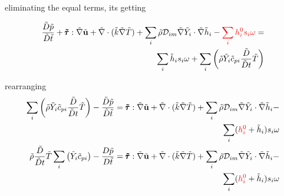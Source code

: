 \documentclass[preprint,12pt,authoryear]{elsarticle}
\begin{document}
eliminating the equal terms, its getting  

\begin{equation}
\begin{split}
        \frac{\tilde{D} \tilde{p}}{\tilde{D}\tilde{t}}
        +       
        \pmb{\tilde{\tau}}:\tilde{\nabla} \tilde{\mathbf{u}} 
        + 
        \tilde{\nabla} \cdot (\tilde{k}\tilde{\nabla} \tilde{T})
        +
        \sum\limits_i 
        \tilde{\rho}
        \mathcal{D}_{im}
        \tilde{\nabla}
        \tilde{Y}_i     
        \cdot
        \tilde{\nabla} 
        \tilde{h}_i
        -
        {\color{red} \sum_i h_i^0 s_i\omega}
        =
        \\
        \sum\limits_i
        \tilde{h}_i
        s_i  \omega
	+
        \sum\limits_i
        \left(
                \tilde{\rho}
                \tilde{Y}_i
                \tilde{c}_{pi}
                \frac{\tilde{D}}{\tilde{D} t}
                \tilde{T}
        \right)
\end{split}
\end{equation}

rearranging
\begin{equation}
\begin{split}
        \sum\limits_i
        \left(
                \tilde{\rho}
                \tilde{Y}_i
                \tilde{c}_{pi}
                \frac{\tilde{D}}{\tilde{D} t}
                \tilde{T}
        \right)
        -
        \frac{\tilde{D} \tilde{p}}{\tilde{D}\tilde{t}}
        =
        \pmb{\tilde{\tau}}:\tilde{\nabla} \tilde{\mathbf{u}} 
        + 
        \tilde{\nabla} \cdot (\tilde{k}\tilde{\nabla} \tilde{T})
        +
        \sum\limits_i 
        \tilde{\rho}
        \mathcal{D}_{im}
        \tilde{\nabla}
        \tilde{Y}_i     
        \cdot
        \tilde{\nabla} 
        \tilde{h}_i
	-
\\
        \sum\limits_i
        ({\color{red} h_i^0} +\tilde{h}_i)
        s_i \omega
\\
        \tilde{\rho}
        \frac{\tilde{D}}{\tilde{D} t}
        \tilde{T}
        \sum\limits_i
        \left(
                \tilde{Y}_i
                \tilde{c}_{pi}
        \right)
        -
        \frac{D \tilde{p}}{D\tilde{t}}
        =
        \pmb{\tilde{\tau}}:\tilde{\nabla} \tilde{\mathbf{u}} 
        + 
        \tilde{\nabla} \cdot (\tilde{k}\tilde{\nabla} \tilde{T})
        +
        \sum\limits_i 
        \tilde{\rho}
        \mathcal{D}_{im}
        \tilde{\nabla}
        \tilde{Y}_i     
        \cdot
        \tilde{\nabla} 
        \tilde{h}_i
	-
\\	
        \sum\limits_i
        ({\color{red} h_i^0} + \tilde{h}_i)
        s_i \omega	
\end{split}
\end{equation}
\end{document}
